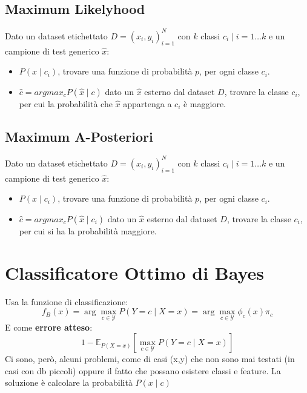 \subsection{Maximum Likelyhood}
Dato un dataset etichettato $D = (x_i, y_i)_{i=1}^{N}$ con $k$ classi $c_i \mid i = 1 \dots k$ e un campione di test generico $\hat{x}$:
\begin{ex}[Approccio]
  \begin{itemize}
    \item $P(x \mid c_i)$, trovare una funzione di probabilità $p$, per ogni classe $c_i$.
    \item $\hat{c} = argmax_c P(\hat{x} \mid c)$ dato un $\hat{x}$ esterno dal dataset $D$, trovare la classe $c_i$, per cui la probabilità che $\hat{x}$ appartenga a $c_i$ è maggiore.
  \end{itemize}
\end{ex}

\subsection{Maximum A-Posteriori}
Dato un dataset etichettato $D = (x_i, y_i)_{i=1}^{N}$ con $k$ classi $c_i \mid i = 1 \dots k$ e un campione di test generico $\hat{x}$:
\begin{ex}[Approccio]
  \begin{itemize}
    \item $P(x \mid c_i)$, trovare una funzione di probabilità $p$, per ogni classe $c_i$.
    \item $\hat{c} = argmax_c P(\hat{x} \mid c_i)$ dato un $\hat{x}$ esterno dal dataset $D$, trovare la classe $c_i$, per cui si ha la probabilità maggiore. 
  \end{itemize}
\end{ex}

\section{Classificatore Ottimo di Bayes}
Usa la funzione di classificazione:
\[
  f_B(x) = \arg\max_{c \in \mathcal{Y}} P(Y = c \mid X = x) = \arg\max_{c \in \mathcal{Y}} \phi_c(x) \pi_c
\]
E come \textbf{errore atteso}:
\[
  1 - \mathbb{E}_{P(X=x)} \left[ \max_{c \in \mathcal{Y}} P(Y = c \mid X = x) \right]
\]
Ci sono, però, alcuni problemi, come di casi (x,y) che non sono mai testati (in casi con db piccoli) oppure il fatto che possano esistere classi e feature.
La soluzione è calcolare la probabilità $P(x \mid c)$

